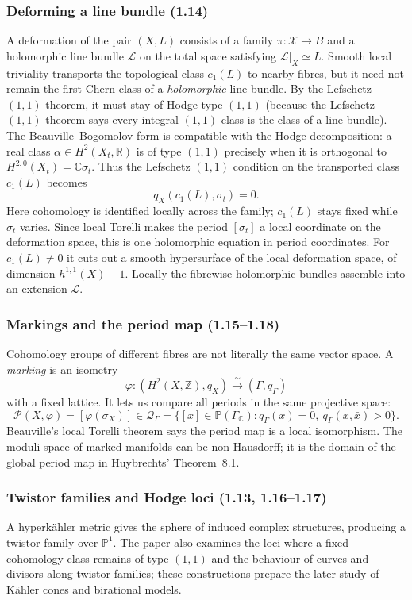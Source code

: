 \subsubsection{Deforming a line bundle (1.14)}
\label{subsubsection-deforming-line-bundle}
A deformation of the pair $(X,L)$ consists
of a family $\pi:\mathcal X\to B$ and a
holomorphic line bundle $\mathcal L$ on
the total space satisfying
$\mathcal L|_X\simeq L$.
Smooth local triviality transports
the topological class $c_1(L)$ to nearby
fibres, but it need not remain the first
Chern class of a \emph{holomorphic} line
bundle. By the Lefschetz $(1,1)$-theorem,
it must stay of Hodge type $(1,1)$
(because the Lefschetz $(1,1)$-theorem says
every integral $(1,1)$-class is the class
of a line bundle).
The Beauville--Bogomolov form is compatible
with the Hodge decomposition: a real class
$\alpha\in H^2(X_t,\mathbb R)$ is of type
$(1,1)$ precisely when it is orthogonal
to $H^{2,0}(X_t)=\mathbb C\sigma_t$.
Thus the Lefschetz $(1,1)$ condition on
the transported class $c_1(L)$ becomes
\[
q_X(c_1(L),\sigma_t)=0.
\]
Here cohomology is identified locally across
the family; $c_1(L)$ stays fixed while
$\sigma_t$ varies. Since local Torelli makes
the period $[\sigma_t]$ a local coordinate
on the deformation space, this is one
holomorphic equation in period coordinates.
For $c_1(L)\ne0$ it cuts out a smooth
hypersurface of the local deformation space,
of dimension $h^{1,1}(X)-1$.
Locally the fibrewise holomorphic bundles
assemble into an extension $\mathcal L$.

\subsubsection{Markings and the period map (1.15--1.18)}
\label{subsubsection-markings-period-map}
Cohomology groups of different fibres are
not literally the same vector space.
A \emph{marking} is an isometry
\[
\varphi:(H^2(X,\mathbb Z),q_X)
\xrightarrow{\ \sim\ }(\Gamma,q_\Gamma)
\]
with a fixed lattice. It lets us compare
all periods in the same projective space:
\[
\mathcal P(X,\varphi)
=[\varphi(\sigma_X)]\in
\mathcal Q_\Gamma
=\{[x]\in\mathbb P(\Gamma_\mathbb C):
q_\Gamma(x)=0,\ q_\Gamma(x,\bar x)>0\}.
\]
Beauville's local Torelli theorem says
the period map is a local isomorphism.
The moduli space of marked manifolds
can be non-Hausdorff; it is the domain
of the global period map in
Huybrechts' Theorem~8.1.

\subsubsection{Twistor families and Hodge loci (1.13, 1.16--1.17)}
\label{subsubsection-twistor-hodge-loci}
A hyperk\"ahler metric gives the sphere
of induced complex structures, producing
a twistor family over $\mathbb P^1$.
The paper also examines the loci where
a fixed cohomology class remains of type
$(1,1)$ and the behaviour of curves and
divisors along twistor families; these
constructions prepare the later study
of K\"ahler cones and birational models.

